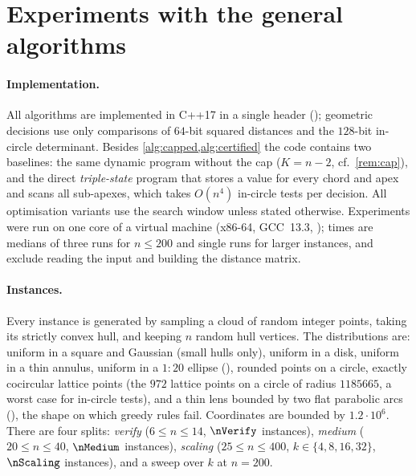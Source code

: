 \section{Experiments with the general algorithms}\label{sec:experiments}

\paragraph{Implementation.}
All algorithms are implemented in C++17 in a single header
(); geometric decisions use only comparisons of $64$-bit
squared distances and the $128$-bit in-circle determinant. Besides
\cref{alg:capped,alg:certified} the code contains two baselines: the same
dynamic program without the cap ($K=n-2$, cf.\ \cref{rem:cap}), and the direct
\emph{triple-state} program that stores a value for every chord and apex and
scans all sub-apexes, which takes $O(n^4)$ in-circle tests per decision. All
optimisation variants use the search window unless stated otherwise.
Experiments were run on one core of a virtual machine (x86-64, GCC~13.3,
); times are medians of three runs for $n\le200$ and single runs
for larger instances, and exclude reading the input and building the distance
matrix.

\paragraph{Instances.}
Every instance is generated by sampling a cloud of random integer points,
taking its strictly convex hull, and keeping $n$ random hull vertices. The
distributions are: uniform in a square and Gaussian (small hulls only),
uniform in a disk, uniform in a thin annulus, uniform in a $1{:}20$ ellipse
(), rounded points on a circle, exactly cocircular lattice points
(the $972$ lattice points on a circle of radius $1185665$, a worst case for
in-circle tests), and a thin lens bounded by two flat parabolic arcs
(), the shape on which greedy rules fail. Coordinates are
bounded by $1.2\cdot10^{6}$. There are four splits: \emph{verify}
($6\le n\le14$, $\nVerify$ instances), \emph{medium} ($20\le n\le40$,
$\nMedium$ instances), \emph{scaling} ($25\le n\le400$, $k\in\{4,8,16,32\}$,
$\nScaling$ instances), and a sweep over $k$ at $n=200$.

